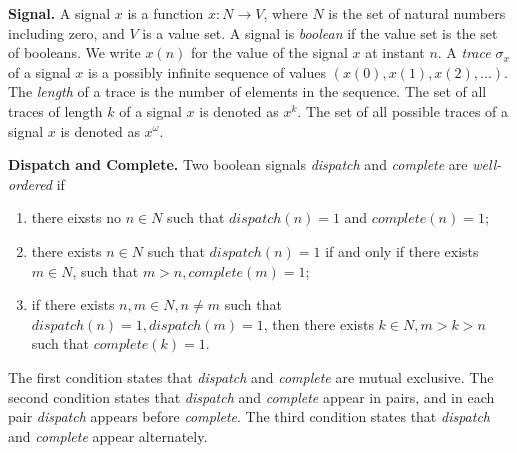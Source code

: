 
{\bf Signal.}
A signal $x$ is a function $x: N \rightarrow V$, where $N$ is the set of natural numbers including zero, and $V$ is a value set. 
A signal is \emph{boolean} if the value set is the set of booleans.
We write $x(n)$ for the value of the signal $x$ at instant $n$. 
A \emph{trace} $\sigma_x$ of a signal $x$ is a possibly infinite sequence of values $(x(0), x(1), x(2),... )$. 
The \emph{length} of a trace is the number of elements in the sequence. 
The set of all traces of length $k$ of a signal $x$ is denoted as $x^k$. 
The set of all possible traces of a signal $x$ is denoted as $x^{\omega}$. 



{\bf Dispatch and Complete.}
Two boolean signals \emph{dispatch} and \emph{complete} are \emph{well-ordered} if 
\begin{enumerate}
	\item there eixsts no $n\in N$ such that $dispatch(n) = 1$ and $complete(n) =  1$;
	\item there exists $n\in N$ such that $dispatch(n) = 1$ if and only if there exists $m\in N$, such that $m > n, complete(m) =  1$;
	\item if there exists $n,m\in N, n \neq m$ such that $dispatch(n) = 1, dispatch(m) = 1$, then there exists $k\in N, m >k> n$ such that $complete(k) = 1$.
\end{enumerate}
The first condition states that \emph{dispatch} and \emph{complete} are mutual exclusive. The second condition states that \emph{dispatch} and \emph{complete} appear in pairs, and in each pair \emph{dispatch} appears before \emph{complete}. The third condition states that \emph{dispatch} and \emph{complete} appear alternately. 

